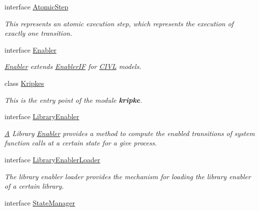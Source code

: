\begin{DoxyCompactItemize}
\item 
interface \hyperlink{interfaceedu_1_1udel_1_1cis_1_1vsl_1_1civl_1_1kripke_1_1IF_1_1AtomicStep}{Atomic\+Step}
\begin{DoxyCompactList}\small\item\em This represents an atomic execution step, which represents the execution of exactly one transition. \end{DoxyCompactList}\item 
interface \hyperlink{interfaceedu_1_1udel_1_1cis_1_1vsl_1_1civl_1_1kripke_1_1IF_1_1Enabler}{Enabler}
\begin{DoxyCompactList}\small\item\em \hyperlink{interfaceedu_1_1udel_1_1cis_1_1vsl_1_1civl_1_1kripke_1_1IF_1_1Enabler}{Enabler} extends \hyperlink{}{Enabler\+I\+F} for \hyperlink{classedu_1_1udel_1_1cis_1_1vsl_1_1civl_1_1CIVL}{C\+I\+V\+L} models. \end{DoxyCompactList}\item 
class \hyperlink{classedu_1_1udel_1_1cis_1_1vsl_1_1civl_1_1kripke_1_1IF_1_1Kripkes}{Kripkes}
\begin{DoxyCompactList}\small\item\em This is the entry point of the module {\bfseries kripke}. \end{DoxyCompactList}\item 
interface \hyperlink{interfaceedu_1_1udel_1_1cis_1_1vsl_1_1civl_1_1kripke_1_1IF_1_1LibraryEnabler}{Library\+Enabler}
\begin{DoxyCompactList}\small\item\em \hyperlink{structA}{A} Library \hyperlink{interfaceedu_1_1udel_1_1cis_1_1vsl_1_1civl_1_1kripke_1_1IF_1_1Enabler}{Enabler} provides a method to compute the enabled transitions of system function calls at a certain state for a give process. \end{DoxyCompactList}\item 
interface \hyperlink{interfaceedu_1_1udel_1_1cis_1_1vsl_1_1civl_1_1kripke_1_1IF_1_1LibraryEnablerLoader}{Library\+Enabler\+Loader}
\begin{DoxyCompactList}\small\item\em The library enabler loader provides the mechanism for loading the library enabler of a certain library. \end{DoxyCompactList}\item 
interface \hyperlink{interfaceedu_1_1udel_1_1cis_1_1vsl_1_1civl_1_1kripke_1_1IF_1_1StateManager}{State\+Manager}

\end{DoxyCompactItemize}
